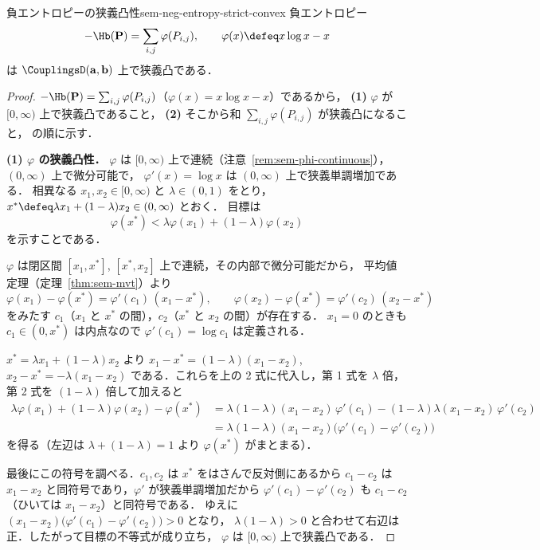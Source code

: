 \begin{claim}{負エントロピーの狭義凸性}{sem-neg-entropy-strict-convex}
  負エントロピー
  \[
    -\Hb(\mathbf{P}) = \sum_{i,j}\varphi(P_{i,j}),
    \qquad \varphi(x) \defeq x\log x - x
  \]
  は $\CouplingsD(\mathbf{a}, \mathbf{b})$ 上で狭義凸である．
\end{claim}

\begin{proof}
  $-\Hb(\mathbf{P}) = \sum_{i,j}\varphi(P_{i,j})$（$\varphi(x) = x\log x - x$）であるから，
  \textbf{(1)} $\varphi$ が $[0,\infty)$ 上で狭義凸であること，
  \textbf{(2)} そこから和 $\sum_{i,j}\varphi(P_{i,j})$ が狭義凸になること，
  の順に示す．

  \textbf{(1) $\varphi$ の狭義凸性．}
  $\varphi$ は $[0,\infty)$ 上で連続（注意~\ref{rem:sem-phi-continuous}），
  $(0,\infty)$ 上で微分可能で，
  $\varphi'(x) = \log x$ は $(0,\infty)$ 上で狭義単調増加である．
  相異なる $x_1, x_2 \in [0,\infty)$ と $\lambda \in (0,1)$ をとり，
  $x^* \defeq \lambda x_1 + (1-\lambda)x_2 \in (0,\infty)$ とおく．
  目標は
  \[
    \varphi(x^*) < \lambda\varphi(x_1) + (1-\lambda)\varphi(x_2)
  \]
  を示すことである．

  $\varphi$ は閉区間 $[x_1, x^*]$, $[x^*, x_2]$ 上で連続，その内部で微分可能だから，
  平均値定理（定理~\ref{thm:sem-mvt}）より
  \[
    \varphi(x_1) - \varphi(x^*) = \varphi'(c_1)\,(x_1 - x^*),
    \qquad
    \varphi(x_2) - \varphi(x^*) = \varphi'(c_2)\,(x_2 - x^*)
  \]
  をみたす $c_1$（$x_1$ と $x^*$ の間），$c_2$（$x^*$ と $x_2$ の間）が存在する．
  $x_1 = 0$ のときも $c_1 \in (0, x^*)$ は内点なので $\varphi'(c_1) = \log c_1$ は定義される．

  $x^* = \lambda x_1 + (1-\lambda)x_2$ より
  $x_1 - x^* = (1-\lambda)(x_1 - x_2)$,
  $x_2 - x^* = -\lambda(x_1 - x_2)$
  である．これらを上の 2 式に代入し，第 1 式を $\lambda$ 倍，第 2 式を $(1-\lambda)$ 倍して加えると
  \begin{align*}
    \lambda\varphi(x_1) + (1-\lambda)\varphi(x_2) - \varphi(x^*)
    &= \lambda(1-\lambda)(x_1 - x_2)\,\varphi'(c_1)
       - (1-\lambda)\lambda(x_1 - x_2)\,\varphi'(c_2) \\
    &= \lambda(1-\lambda)(x_1 - x_2)\bigl(\varphi'(c_1) - \varphi'(c_2)\bigr)
  \end{align*}
  を得る（左辺は $\lambda + (1-\lambda) = 1$ より $\varphi(x^*)$ がまとまる）．

  最後にこの符号を調べる．$c_1, c_2$ は $x^*$ をはさんで反対側にあるから
  $c_1 - c_2$ は $x_1 - x_2$ と同符号であり，$\varphi'$ が狭義単調増加だから
  $\varphi'(c_1) - \varphi'(c_2)$ も $c_1 - c_2$（ひいては $x_1 - x_2$）と同符号である．
  ゆえに $(x_1 - x_2)\bigl(\varphi'(c_1) - \varphi'(c_2)\bigr) > 0$ となり，
  $\lambda(1-\lambda) > 0$ と合わせて右辺は正．したがって目標の不等式が成り立ち，
  $\varphi$ は $[0,\infty)$ 上で狭義凸である．


\end{proof}
